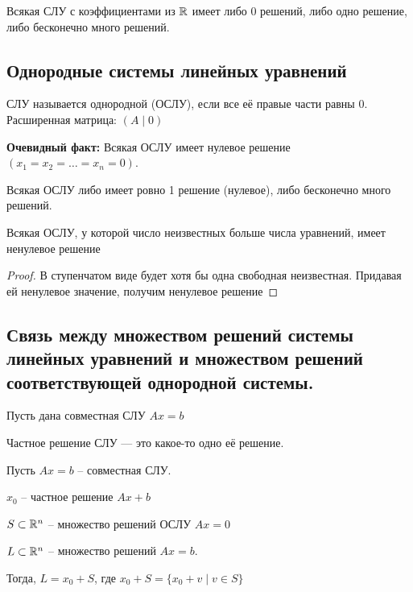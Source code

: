 \setcounter{theorem}{1}
\begin{corollary}
    Всякая СЛУ с коэффициентами из $\mathbb{R}$ имеет либо 0 решений, либо одно решение, либо бесконечно много решений.
\end{corollary}


\subsection{Однородные системы линейных уравнений}
\begin{definition}
    СЛУ называется однородной (ОСЛУ), если все её правые части равны 0. Расширенная матрица: $(A \mid 0)$
\end{definition}

\noindent
\textbf{Очевидный факт: } Всякая ОСЛУ имеет нулевое решение $(x_1 = x_2 = \dots = x_n = 0)$.

\begin{corollary}
    Всякая ОСЛУ либо имеет ровно 1 решение (нулевое), либо бесконечно много решений.
\end{corollary}

\begin{corollary}
    Всякая ОСЛУ, у которой число неизвестных больше числа уравнений, имеет ненулевое решение
\end{corollary}

\begin{proof}
    В ступенчатом виде будет хотя бы одна свободная неизвестная. Придавая ей ненулевое значение, получим ненулевое решение
\end{proof}


\subsection{Связь между множеством решений системы линейных уравнений и множеством решений соответствующей однородной системы.}

Пусть дана совместная СЛУ $Ax = b$

Частное решение СЛУ --- это какое-то одно её решение.

\begin{proposition}
    Пусть $Ax = b$ -- совместная СЛУ.

    $x_0$ -- частное решение $Ax + b$

    $S \subset \mathbb{R}^n$ -- множество решений ОСЛУ $Ax = 0$

    $L \subset \mathbb{R}^n $ -- множество решений $Ax = b$.

    Тогда, $L = x_0 + S$, где $x_0 + S = \{x_0 + v \mid v \in S\}$
\end{proposition}

